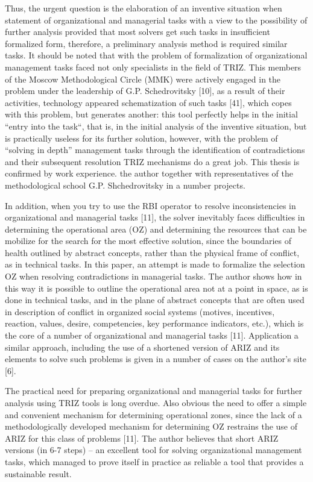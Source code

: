 Thus, the urgent question is the elaboration of an inventive situation when
statement of organizational and managerial tasks with a view to the
possibility of further analysis provided that most solvers get such tasks in
insufficient formalized form, therefore, a preliminary analysis method is
required similar tasks. It should be noted that with the problem of
formalization of organizational management tasks faced not only specialists in
the field of TRIZ. This members of the Moscow Methodological Circle (MMK) were
actively engaged in the problem under the leadership of G.P. Schedrovitsky
[10], as a result of their activities, technology appeared schematization of
such tasks [41], which copes with this problem, but generates another: this
tool perfectly helps in the initial “entry into the task“, that is, in the
initial analysis of the inventive situation, but is practically useless for
its further solution, however, with the problem of “solving in depth”
management tasks through the identification of contradictions and their
subsequent resolution TRIZ mechanisms do a great job. This thesis is confirmed
by work experience.  the author together with representatives of the
methodological school G.P. Shchedrovitsky in a number projects.

In addition, when you try to use the RBI operator to resolve inconsistencies
in organizational and managerial tasks [11], the solver inevitably faces
difficulties in determining the operational area (OZ) and determining the
resources that can be mobilize for the search for the most effective solution,
since the boundaries of health outlined by abstract concepts, rather than the
physical frame of conflict, as in technical tasks. In this paper, an attempt
is made to formalize the selection OZ when resolving contradictions in
managerial tasks. The author shows how in this way it is possible to outline
the operational area not at a point in space, as is done in technical tasks,
and in the plane of abstract concepts that are often used in description of
conflict in organized social systems (motives, incentives, reaction, values,
desire, competencies, key performance indicators, etc.), which is the core of
a number of organizational and managerial tasks [11]. Application a similar
approach, including the use of a shortened version of ARIZ and its elements to
solve such problems is given in a number of cases on the author’s site [6].

The practical need for preparing organizational and managerial tasks for
further analysis using TRIZ tools is long overdue. Also obvious the need to
offer a simple and convenient mechanism for determining operational zones,
since the lack of a methodologically developed mechanism for determining OZ
restrains the use of ARIZ for this class of problems [11]. The author believes
that short ARIZ versions (in 6-7 steps) -- an excellent tool for solving
organizational management tasks, which managed to prove itself in practice as
reliable a tool that provides a sustainable result.

